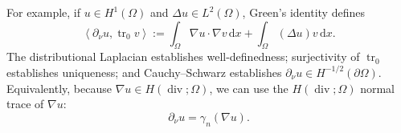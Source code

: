 \documentclass[11pt,a4paper]{article}
\newcommand{\Om}{\Omega}
\newcommand{\dd}{\,\mathrm{d}}
\newcommand{\tr}{\operatorname{tr}}
\newcommand{\Div}{\operatorname{div}}
\newcommand{\grad}{\nabla}
\newcommand{\dual}[2]{\left\langle #1,#2\right\rangle}
\begin{document}
For example, if $u\in H^1(\Om)$ and $\Delta u\in L^2(\Om)$, Green's
identity defines
\[
    \dual{\partial_\nu u}{\tr_0v}
     :=\int_\Om\grad u\cdot\grad v\dd x
        +\int_\Om(\Delta u)v\dd x.
\]
The distributional Laplacian establishes well-definedness; surjectivity
of $\tr_0$ establishes uniqueness; and Cauchy--Schwarz establishes $\partial_\nu u\in H^{-1/2}(\partial\Om)$.
Equivalently, because $\grad u\in H(\Div;\Om)$, we can use the
$H(\Div; \Om)$ normal trace of $\grad u$:
\[
    \partial_\nu u=\gamma_n(\grad u).
\]



\end{document}
